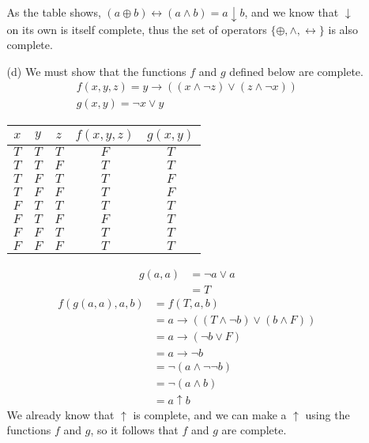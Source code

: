 \documentclass[fleqn]{article}
\begin{document}
\begin{enumerate}
\begin{enumerate}
		As the table shows, \((a \oplus b) \leftrightarrow (a \land b) = a \downarrow b\), and we know that \(\downarrow\) on its own is itself complete, thus the set of operators \(\{\oplus, \land, \leftrightarrow\}\) is also complete.

		\item[(d)]
		We must show that the functions \(f\) and \(g\) defined below are complete.
		\begin{gather*}
			f(x, y, z) = y \rightarrow ((x \land \lnot z) \lor (z \land \lnot x)) \\
			g(x, y) = \lnot x \lor y
		\end{gather*}
		\begin{tabular}{||c|c|c||c|c||}
			\hline
			\(x\) & \(y\) & \(z\) & \(f(x, y, z)\) & \(g(x, y)\) \\
			\hline
			\(T\) & \(T\) & \(T\) & \(F\) & \(T\) \\
			\(T\) & \(T\) & \(F\) & \(T\) & \(T\) \\
			\(T\) & \(F\) & \(T\) & \(T\) & \(F\) \\
			\(T\) & \(F\) & \(F\) & \(T\) & \(F\) \\
			\(F\) & \(T\) & \(T\) & \(T\) & \(T\) \\
			\(F\) & \(T\) & \(F\) & \(F\) & \(T\) \\
			\(F\) & \(F\) & \(T\) & \(T\) & \(T\) \\
			\(F\) & \(F\) & \(F\) & \(T\) & \(T\) \\
			\hline
		\end{tabular}

		\begin{align*}
			g(a, a) &= \lnot a \lor a \\
			&= T
		\end{align*}
		\begin{align*}
			f(g(a, a), a, b) &= f(T, a, b) \\
			&= a \rightarrow ((T \land \lnot b) \lor (b \land F)) \\
			&= a \rightarrow (\lnot b \lor F) \\
			&= a \rightarrow \lnot b \\
			&= \lnot (a \land \lnot \lnot b) \\
			&= \lnot (a \land b) \\
			&= a \uparrow b
		\end{align*}
		We already know that \(\uparrow\) is complete, and we can make a \(\uparrow\) using the functions \(f\) and \(g\), so it follows that \(f\) and \(g\) are complete.
	\end{enumerate}
	
\end{enumerate}
	
\end{document}
